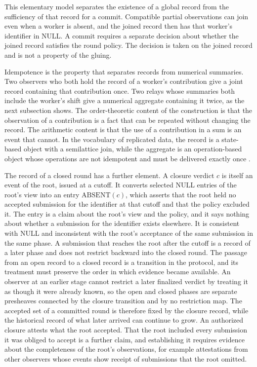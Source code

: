 \documentclass[11pt]{article}
\theoremstyle{definition}
\theoremstyle{remark}
\begin{document}
This elementary model separates the existence of a global record from the sufficiency of that record for a commit. Compatible partial observations can join even when a worker is absent, and the joined record then has that worker's identifier in NULL. A commit requires a separate decision about whether the joined record satisfies the round policy. The decision is taken on the joined record and is not a property of the gluing.

Idempotence is the property that separates records from numerical summaries. Two observers who both hold the record of a worker's contribution give a joint record containing that contribution once. Two relays whose summaries both include the worker's shift give a numerical aggregate containing it twice, as the next subsection shows. The order-theoretic content of the construction is that the observation of a contribution is a fact that can be repeated without changing the record. The arithmetic content is that the use of a contribution in a sum is an event that cannot. In the vocabulary of replicated data, the record is a state-based object with a semilattice join, while the aggregate is an operation-based object whose operations are not idempotent and must be delivered exactly once \cite{shapiro2011}.

The record of a closed round has a further element. A closure verdict $c$ is itself an event of the root, issued at a cutoff. It converts selected NULL entries of the root's view into an entry $\mathrm{ABSENT}(c)$, which asserts that the root held no accepted submission for the identifier at that cutoff and that the policy excluded it. The entry is a claim about the root's view and the policy, and it says nothing about whether a submission for the identifier exists elsewhere. It is consistent with NULL and inconsistent with the root's acceptance of the same submission in the same phase. A submission that reaches the root after the cutoff is a record of a later phase and does not restrict backward into the closed round. The passage from an open record to a closed record is a transition in the protocol, and its treatment must preserve the order in which evidence became available. An observer at an earlier stage cannot restrict a later finalized verdict by treating it as though it were already known, so the open and closed phases are separate presheaves connected by the closure transition and by no restriction map. The accepted set of a committed round is therefore fixed by the closure record, while the historical record of what later arrived can continue to grow. An authorized closure attests what the root accepted. That the root included every submission it was obliged to accept is a further claim, and establishing it requires evidence about the completeness of the root's observations, for example attestations from other observers whose events show receipt of submissions that the root omitted.
\end{document}
